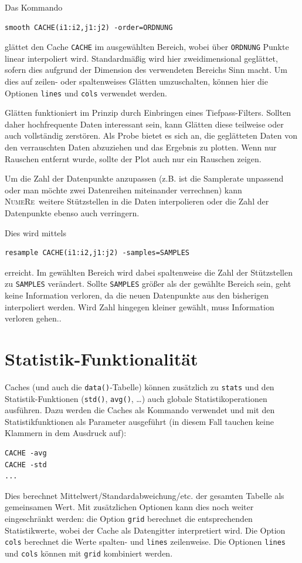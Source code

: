 \documentclass[DIV=14,headsepline,footsepline]{scrbook}
\newcommand{\NR}{\textsc{Nu\-me\-Re}}
\begin{document}
				Das Kommando
				\begin{lstlisting}
smooth CACHE(i1:i2,j1:j2) -order=ORDNUNG
				\end{lstlisting}
				glättet den Cache \lstinline+CACHE+ im ausgewählten Bereich, wobei über \lstinline+ORDNUNG+ Punkte linear interpoliert wird. Standardmäßig wird hier zweidimensional geglättet, sofern dies aufgrund der Dimension des verwendeten Bereichs Sinn macht. Um dies auf zeilen- oder spaltenweises Glätten umzuschalten, können hier die Optionen \lstinline+lines+ und \lstinline+cols+ verwendet werden.
				
				Glätten funktioniert im Prinzip durch Einbringen eines Tiefpass-Filters. Sollten daher hochfrequente Daten interessant sein, kann Glätten diese teilweise oder auch vollständig zerstören. Als Probe bietet es sich an, die geglätteten Daten von den verrauschten Daten abzuziehen und das Ergebnis zu plotten. Wenn nur Rauschen entfernt wurde, sollte der Plot auch nur ein Rauschen zeigen.
				
				Um die Zahl der Datenpunkte anzupassen (z.B. ist die Samplerate unpassend oder man möchte zwei Datenreihen miteinander verrechnen) kann \NR\ weitere Stützstellen in die Daten interpolieren oder die Zahl der Datenpunkte ebenso auch verringern.
				
				Dies wird mittels
				\begin{lstlisting}
resample CACHE(i1:i2,j1:j2) -samples=SAMPLES
				\end{lstlisting}
				erreicht. Im gewählten Bereich wird dabei spaltenweise die Zahl der Stützstellen zu \lstinline+SAMPLES+ verändert. Sollte \lstinline+SAMPLES+ größer als der gewählte Bereich sein, geht keine Information verloren, da die neuen Datenpunkte aus den bisherigen interpoliert werden. Wird Zahl hingegen kleiner gewählt, muss Information verloren gehen..
				
			\section{Statistik-Funktionalität}
				Caches (und auch die \lstinline+data()+-Tabelle) können zusätzlich zu \lstinline+stats+ und den Statistik-Funktionen (\lstinline+std()+, \lstinline+avg()+, \ldots) auch globale Statistikoperationen ausführen. Dazu werden die Caches als Kommando verwendet und mit den Statistikfunktionen als Parameter ausgeführt (in diesem Fall tauchen keine Klammern in dem Ausdruck auf):
				\begin{lstlisting}
CACHE -avg
CACHE -std
...
				\end{lstlisting}
				Dies berechnet Mittelwert/Standardabweichung/etc. der gesamten Tabelle als gemeinsamen Wert. Mit zusätzlichen Optionen kann dies noch weiter eingeschränkt werden: die Option \lstinline+grid+ berechnet die entsprechenden Statistikwerte, wobei der Cache als Datengitter interpretiert wird. Die Option \lstinline+cols+ berechnet die Werte spalten- und \lstinline+lines+ zeilenweise. Die Optionen \lstinline+lines+ und \lstinline+cols+ können mit \lstinline+grid+ kombiniert werden.
\end{document}
